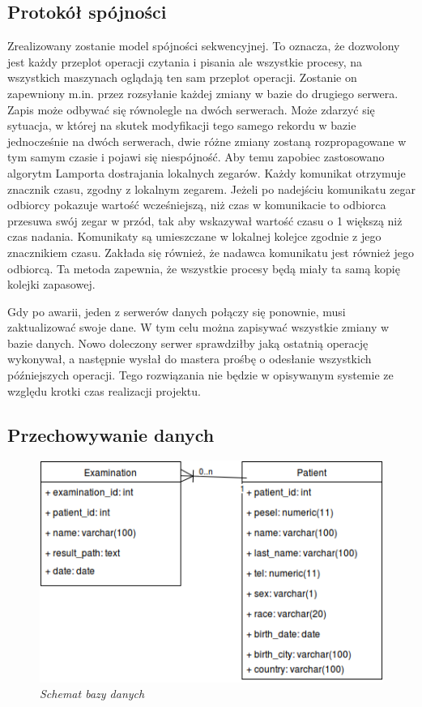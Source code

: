 \subsection{Protokół spójności}
Zrealizowany zostanie model spójności sekwencyjnej. To oznacza, że dozwolony jest każdy przeplot operacji czytania i pisania ale wszystkie procesy, na wszystkich maszynach oglądają ten sam przeplot operacji. Zostanie on zapewniony m.in. przez rozsyłanie każdej zmiany w bazie do drugiego serwera. Zapis może odbywać się równolegle na dwóch serwerach. Może zdarzyć się sytuacja, w której na skutek modyfikacji tego samego rekordu w bazie jednocześnie na dwóch serwerach, dwie różne zmiany zostaną rozpropagowane w tym samym czasie i pojawi się niespójność. Aby temu zapobiec zastosowano algorytm Lamporta dostrajania lokalnych zegarów. Każdy komunikat otrzymuje znacznik czasu, zgodny z lokalnym zegarem. Jeżeli po nadejściu komunikatu zegar odbiorcy pokazuje wartość wcześniejszą, niż czas w komunikacie to odbiorca przesuwa swój zegar w przód, tak aby wskazywał wartość czasu o 1 większą niż czas nadania. Komunikaty są umieszczane w lokalnej kolejce zgodnie z jego znacznikiem czasu. Zakłada się również, że nadawca komunikatu jest również jego odbiorcą. Ta metoda zapewnia, że wszystkie procesy będą miały ta samą kopię kolejki zapasowej.

Gdy po awarii, jeden z serwerów danych połączy się ponownie, musi zaktualizować swoje dane. W tym celu można zapisywać wszystkie zmiany w bazie danych. Nowo doleczony serwer sprawdziłby jaką ostatnią operację wykonywał, a następnie wysłał do mastera prośbę o odesłanie wszystkich późniejszych operacji. Tego rozwiązania nie będzie w opisywanym systemie ze względu krotki czas realizacji projektu.

\subsection{Przechowywanie danych}

\begin{figure}[!h]
    \begin{center}
    \includegraphics[angle=0,scale=0.7]{img/dbschema.png}
    \end{center}
    \caption{\em Schemat bazy danych}
    \label{fig:db_schema}
\end{figure}

